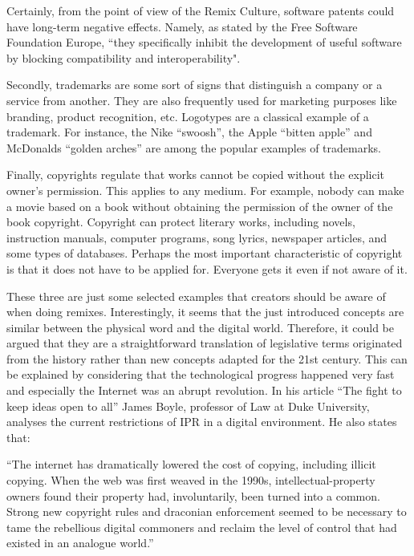 Certainly, from the point of view of the Remix Culture, software patents could have long-term negative effects. Namely, as stated by the Free Software Foundation Europe, “they specifically inhibit the development of useful software by blocking compatibility and interoperability".

Secondly, trademarks are some sort of signs that distinguish a company or a service from another. They are also frequently used for marketing purposes like branding, product recognition, etc. Logotypes are a classical example of a trademark. For instance, the Nike “swoosh”, the Apple “bitten apple” and McDonalds “golden arches” are among the popular examples of trademarks.

Finally, copyrights regulate that works cannot be copied without the explicit owner’s permission. This applies to any medium. For example, nobody can make a movie based on a book without obtaining the permission of the owner of the book copyright. Copyright can protect literary works, including novels, instruction manuals, computer programs, song lyrics, newspaper articles, and some types of databases. Perhaps the most important characteristic of copyright is that it does not have to be applied for. Everyone gets it even if not aware of it.

These three are just some selected examples that creators should be aware of when doing remixes. Interestingly, it seems that the just introduced concepts are similar between the physical word and the digital world. Therefore, it could be argued that they are a straightforward translation of legislative terms originated from the history rather than new concepts adapted for the 21st century. This can be explained by considering that the technological progress happened very fast and especially the Internet was an abrupt revolution. In his article “The fight to keep ideas open to all” James Boyle, professor of Law at Duke University, analyses the current restrictions of IPR in a digital environment. He also states that:

\begin{displayquote}
“The internet has dramatically lowered the cost of copying, including illicit copying. When the web was first weaved in the 1990s, intellectual-property owners found their property had, involuntarily, been turned into a common. Strong new copyright rules and draconian enforcement seemed to be necessary to tame the rebellious digital commoners and reclaim the level of control that had existed in an analogue world.”
\end{displayquote}

